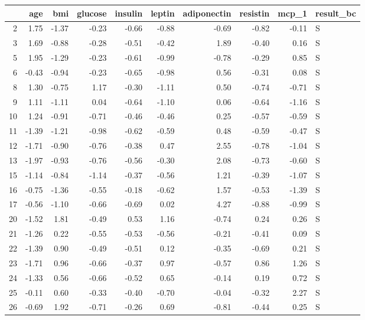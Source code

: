 \begin{table}[ht]
\centering
\begin{tabular}{rrrrrrrrrl}
  \hline
 & age & bmi & glucose & insulin & leptin & adiponectin & resistin & mcp\_1 & result\_bc \\ 
  \hline
2 & 1.75 & -1.37 & -0.23 & -0.66 & -0.88 & -0.69 & -0.82 & -0.11 & S \\ 
  3 & 1.69 & -0.88 & -0.28 & -0.51 & -0.42 & 1.89 & -0.40 & 0.16 & S \\ 
  5 & 1.95 & -1.29 & -0.23 & -0.61 & -0.99 & -0.78 & -0.29 & 0.85 & S \\ 
  6 & -0.43 & -0.94 & -0.23 & -0.65 & -0.98 & 0.56 & -0.31 & 0.08 & S \\ 
  8 & 1.30 & -0.75 & 1.17 & -0.30 & -1.11 & 0.50 & -0.74 & -0.71 & S \\ 
  9 & 1.11 & -1.11 & 0.04 & -0.64 & -1.10 & 0.06 & -0.64 & -1.16 & S \\ 
  10 & 1.24 & -0.91 & -0.71 & -0.46 & -0.46 & 0.25 & -0.57 & -0.59 & S \\ 
  11 & -1.39 & -1.21 & -0.98 & -0.62 & -0.59 & 0.48 & -0.59 & -0.47 & S \\ 
  12 & -1.71 & -0.90 & -0.76 & -0.38 & 0.47 & 2.55 & -0.78 & -1.04 & S \\ 
  13 & -1.97 & -0.93 & -0.76 & -0.56 & -0.30 & 2.08 & -0.73 & -0.60 & S \\ 
  15 & -1.14 & -0.84 & -1.14 & -0.37 & -0.56 & 1.21 & -0.39 & -1.07 & S \\ 
  16 & -0.75 & -1.36 & -0.55 & -0.18 & -0.62 & 1.57 & -0.53 & -1.39 & S \\ 
  17 & -0.56 & -1.10 & -0.66 & -0.69 & 0.02 & 4.27 & -0.88 & -0.99 & S \\ 
  20 & -1.52 & 1.81 & -0.49 & 0.53 & 1.16 & -0.74 & 0.24 & 0.26 & S \\ 
  21 & -1.26 & 0.22 & -0.55 & -0.53 & -0.56 & -0.21 & -0.41 & 0.09 & S \\ 
  22 & -1.39 & 0.90 & -0.49 & -0.51 & 0.12 & -0.35 & -0.69 & 0.21 & S \\ 
  23 & -1.71 & 0.96 & -0.66 & -0.37 & 0.97 & -0.57 & 0.86 & 1.26 & S \\ 
  24 & -1.33 & 0.56 & -0.66 & -0.52 & 0.65 & -0.14 & 0.19 & 0.72 & S \\ 
  25 & -0.11 & 0.60 & -0.33 & -0.40 & -0.70 & -0.04 & -0.32 & 2.27 & S \\ 
  26 & -0.69 & 1.92 & -0.71 & -0.26 & 0.69 & -0.81 & -0.44 & 0.25 & S \\ 

\end{tabular}
\end{table}
